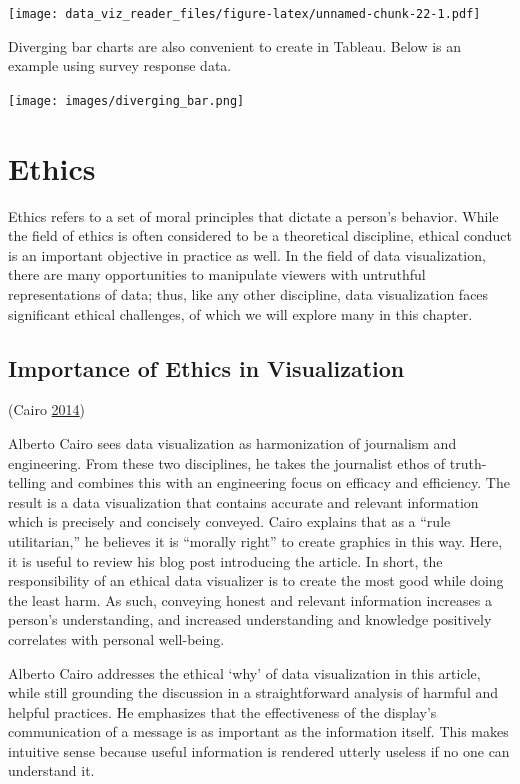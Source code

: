 \documentclass[]{book}
\begin{document}
\texttt{[image: data\_viz\_reader\_files/figure-latex/unnamed-chunk-22-1.pdf]}

Diverging bar charts are also convenient to create in Tableau. Below is an example using survey response data.

\texttt{[image: images/diverging\_bar.png]}

\hypertarget{ethics}{%
\chapter{Ethics}\label{ethics}}

Ethics refers to a set of moral principles that dictate a person's behavior. While the field of ethics is often considered to be a theoretical discipline, ethical conduct is an important objective in practice as well. In the field of data visualization, there are many opportunities to manipulate viewers with untruthful representations of data; thus, like any other discipline, data visualization faces significant ethical challenges, of which we will explore many in this chapter.

\hypertarget{importance-of-ethics-in-visualization}{%
\section{Importance of Ethics in Visualization}\label{importance-of-ethics-in-visualization}}

(Cairo \protect\hyperlink{ref-ethical_infographics}{2014})

Alberto Cairo sees data visualization as harmonization of journalism and engineering. From these two disciplines, he takes the journalist ethos of truth-telling and combines this with an engineering focus on efficacy and efficiency. The result is a data visualization that contains accurate and relevant information which is precisely and concisely conveyed. Cairo explains that as a ``rule utilitarian,'' he believes it is ``morally right'' to create graphics in this way. Here, it is useful to review his blog post introducing the article. In short, the responsibility of an ethical data visualizer is to create the most good while doing the least harm. As such, conveying honest and relevant information increases a person's understanding, and increased understanding and knowledge positively correlates with personal well-being.

Alberto Cairo addresses the ethical `why' of data visualization in this article, while still grounding the discussion in a straightforward analysis of harmful and helpful practices. He emphasizes that the effectiveness of the display's communication of a message is as important as the information itself. This makes intuitive sense because useful information is rendered utterly useless if no one can understand it.
\end{document}
